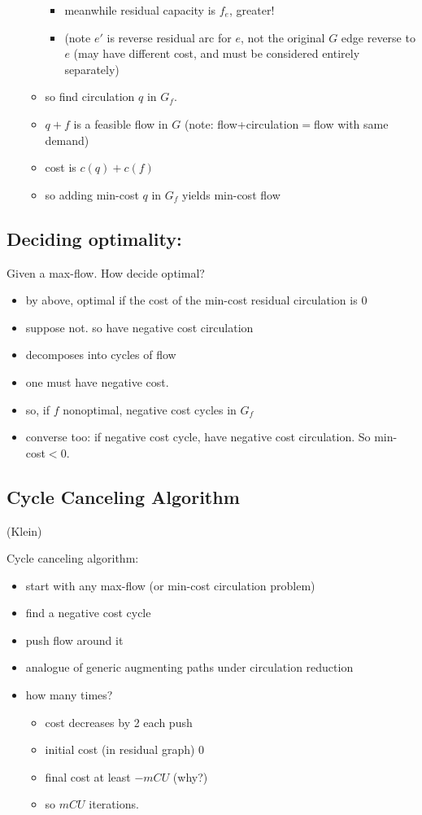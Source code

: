 \documentclass{article}
\begin{document}
\begin{itemize}
\begin{itemize}
\begin{itemize}
    \item meanwhile residual capacity is $f_e$, greater!
    \item (note $e'$ is reverse residual arc for $e$, not the original
      $G$ edge reverse to $e$ (may have different cost, and must
      be considered entirely separately)
\end{itemize}
    \item so find circulation $q$ in $G_f$.
    \item $q+f$ is a feasible flow in $G$ (note: flow+circulation$=$flow with same demand)
    \item cost is $c(q)+c(f)$
    \item so adding min-cost $q$ in $G_f$ yields min-cost flow
    \end{itemize}
  \end{itemize}


\subsection*{Deciding optimality:}
Given a max-flow.  How decide optimal?
  \begin{itemize}
  \item by above, optimal if the cost of the min-cost residual circulation is 0
  \item suppose not.  so have negative cost circulation
  \item decomposes into cycles of flow
  \item one must have negative cost.
  \item so, if $f$ nonoptimal, negative cost cycles in $G_f$
  \item converse too: if negative cost cycle, have negative cost
    circulation.  So min-cost$<0$.
  \end{itemize}

\subsection*{Cycle Canceling Algorithm}

(Klein)

Cycle canceling algorithm:
\begin{itemize}
\item start with any max-flow (or min-cost circulation problem)
\item find a negative cost cycle
\item push flow around it
\item analogue of generic augmenting paths under circulation reduction
\item how many times?
\begin{itemize}
\item cost decreases by 2 each push
\item initial cost (in residual graph) 0
\item final cost at least $-mCU$ (why?)
\item so $mCU$ iterations.
\end{itemize}
\end{itemize}
\end{document}
